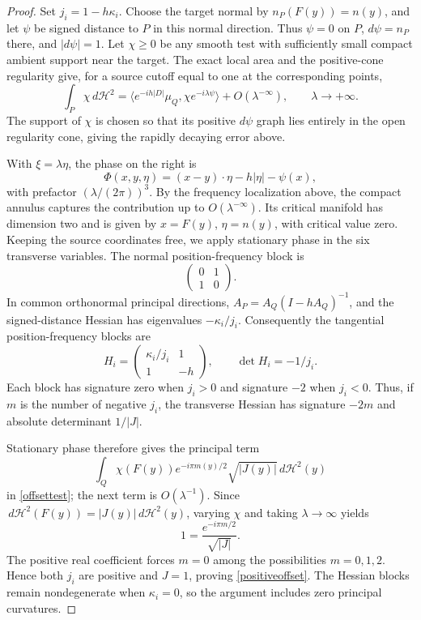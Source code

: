 \documentclass[11pt]{article}
\newcommand{\HH}{\mathcal H}
\newcommand{\dd}{\,d}
\begin{document}
\begin{proof}
Set $j_i=1-h\kappa_i$. Choose the target normal by $n_P(F(y))=n(y)$, and let $\psi$ be signed distance to $P$ in this normal direction. Thus $\psi=0$ on $P$, $d\psi=n_P$ there, and $|d\psi|=1$. Let $\chi\ge0$ be any smooth test with sufficiently small compact ambient support near the target. The exact local area and the positive-cone regularity give, for a source cutoff equal to one at the corresponding points,
\begin{equation}\label{offsettest}
 \int_P\chi\dd\HH^2
 =\langle e^{-ih|D|}\mu_Q,\chi e^{-i\lambda\psi}\rangle
   +O(\lambda^{-\infty}),\qquad\lambda\to+\infty.
\end{equation}
The support of $\chi$ is chosen so that its positive $d\psi$ graph lies entirely in the open regularity cone, giving the rapidly decaying error above.

With $\xi=\lambda\eta$, the phase on the right is
\[
 \Phi(x,y,\eta)=(x-y)\cdot\eta-h|\eta|-\psi(x),
\]
with prefactor $(\lambda/(2\pi))^3$. By the frequency localization above, the compact annulus captures the contribution up to $O(\lambda^{-\infty})$. Its critical manifold has dimension two and is given by $x=F(y)$, $\eta=n(y)$, with critical value zero. Keeping the source coordinates free, we apply stationary phase in the six transverse variables. The normal position-frequency block is
\[
 \begin{pmatrix}0&1\\1&0\end{pmatrix}.
\]
In common orthonormal principal directions, $A_P=A_Q(I-hA_Q)^{-1}$, and the signed-distance Hessian has eigenvalues $-\kappa_i/j_i$. Consequently the tangential position-frequency blocks are
\[
 H_i=\begin{pmatrix}\kappa_i/j_i&1\\1&-h\end{pmatrix},
 \qquad \det H_i=-1/j_i.
\]
Each block has signature zero when $j_i>0$ and signature $-2$ when $j_i<0$. Thus, if $m$ is the number of negative $j_i$, the transverse Hessian has signature $-2m$ and absolute determinant $1/|J|$.

Stationary phase \cite[Section 7.7]{HormSP} therefore gives the principal term
\[
 \int_Q\chi(F(y))e^{-i\pi m(y)/2}\sqrt{|J(y)|}\dd\HH^2(y)
\]
in \eqref{offsettest}; the next term is $O(\lambda^{-1})$. Since $\dd\HH^2(F(y))=|J(y)|\dd\HH^2(y)$, varying $\chi$ and taking $\lambda\to\infty$ yields
\[
 1=\frac{e^{-i\pi m/2}}{\sqrt{|J|}}.
\]
The positive real coefficient forces $m=0$ among the possibilities $m=0,1,2$. Hence both $j_i$ are positive and $J=1$, proving \eqref{positiveoffset}. The Hessian blocks remain nondegenerate when $\kappa_i=0$, so the argument includes zero principal curvatures.
\end{proof}
\end{document}

